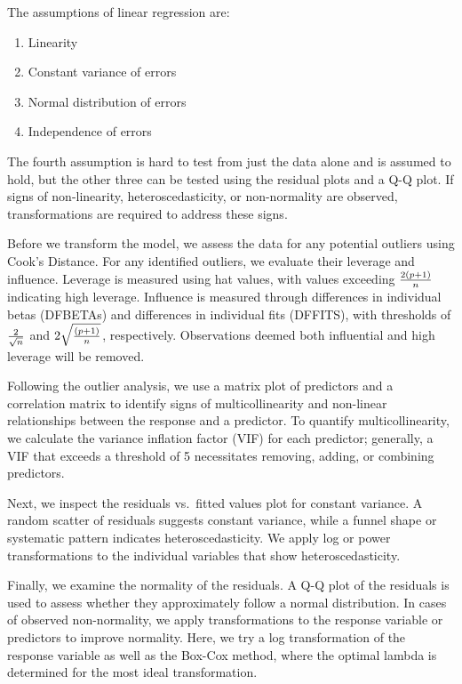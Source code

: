 \documentclass[
  10pt,
]{article}
\providecommand{\tightlist}{%
  \setlength{\itemsep}{0pt}\setlength{\parskip}{0pt}}
\begin{document}
The assumptions of linear regression are:

\begin{enumerate}
\def\labelenumi{\arabic{enumi})}
\tightlist
\item
  Linearity
\item
  Constant variance of errors
\item
  Normal distribution of errors
\item
  Independence of errors
\end{enumerate}

The fourth assumption is hard to test from just the data alone and is
assumed to hold, but the other three can be tested using the residual
plots and a Q-Q plot. If signs of non-linearity, heteroscedasticity, or
non-normality are observed, transformations are required to address
these signs.

Before we transform the model, we assess the data for any potential
outliers using Cook's Distance. For any identified outliers, we evaluate
their leverage and influence. Leverage is measured using hat values,
with values exceeding \(2(p+1)\over n\) indicating high leverage.
Influence is measured through differences in individual betas (DFBETAs)
and differences in individual fits (DFFITS), with thresholds of
\(2\over \sqrt{n}\) and \(2\sqrt{(p+1)\over n}\), respectively.
Observations deemed both influential and high leverage will be removed.

Following the outlier analysis, we use a matrix plot of predictors and a
correlation matrix to identify signs of multicollinearity and non-linear
relationships between the response and a predictor. To quantify
multicollinearity, we calculate the variance inflation factor (VIF) for
each predictor; generally, a VIF that exceeds a threshold of 5
necessitates removing, adding, or combining predictors.

Next, we inspect the residuals vs.~fitted values plot for constant
variance. A random scatter of residuals suggests constant variance,
while a funnel shape or systematic pattern indicates heteroscedasticity.
We apply log or power transformations to the individual variables that
show heteroscedasticity.

Finally, we examine the normality of the residuals. A Q-Q plot of the
residuals is used to assess whether they approximately follow a normal
distribution. In cases of observed non-normality, we apply
transformations to the response variable or predictors to improve
normality. Here, we try a log transformation of the response variable as
well as the Box-Cox method, where the optimal lambda is determined for
the most ideal transformation.
\end{document}
